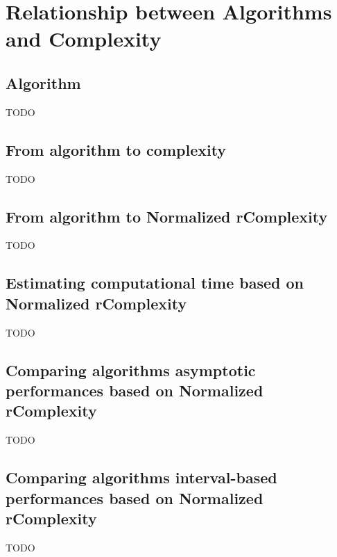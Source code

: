 \chapter{Relationship between Algorithms and Complexity}


\section{Algorithm}
TODO

\section{From algorithm to complexity}
TODO

\section{From algorithm to Normalized rComplexity}
TODO

\section{Estimating computational time based on Normalized rComplexity}
TODO

\section{Comparing algorithms asymptotic performances based on Normalized rComplexity}
TODO

\section{Comparing algorithms interval-based performances based on Normalized rComplexity}
TODO

